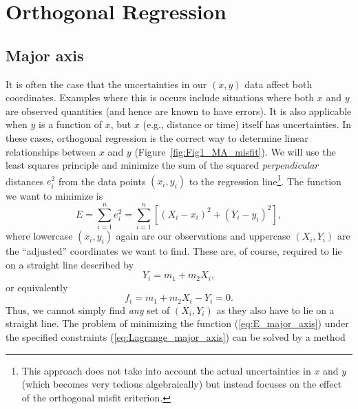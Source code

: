 \section{Orthogonal Regression}
\subsection{Major axis}

	It is often the case that the uncertainties in our $(x,y)$ data affect both coordinates.  
Examples where this is occurs include situations where both $x$ and $y$ are observed quantities 
(and hence are known to have errors).  It is also  applicable when $y$ is a function of $x$, but $x$ (e.g., distance 
or time) itself has uncertainties.  In these cases, orthogonal regression is the correct way to 
determine linear relationships between $x$ and $y$ (Figure~\ref{fig:Fig1_MA_misfit}).
We will use the least squares principle and minimize the sum of the squared \emph{perpendicular} 
distances $e_i^2$ from the data points $(x_i,y_i)$ to the regression line\footnote{This approach does not take into account
the actual uncertainties in $x$ and $y$ (which becomes very tedious algebraically) but instead focuses on the effect
of the orthogonal misfit criterion.}.  The function we want to minimize is
\begin{equation}
E = \sum_{i=1}^n e_i^2 = \sum_{i=1}^n \left [ (X_i - x_i)^2 + (Y_i - y_i)^2 \right ],
\label{eq:E_major_axis}
\end{equation}	 	
where lowercase $(x_i, y_i)$ again are our observations and uppercase $(X_i, Y_i)$ are the ``adjusted'' 
coordinates we want to find.  These are, of course, required to  lie on a straight line described by
\begin{equation}
Y_i = m_1 + m_2 X_i,
\label{eq:line_constraint}
\end{equation}	
or equivalently
\begin{equation}
f_i = m_1 + m_2 X_i - Y_i = 0.
\label{eq:Lagrange_major_axis}
\end{equation}
Thus, we cannot simply find \emph{any} set of $(X_i, Y_i)$ as they also have to lie on a straight line.  The problem 
of minimizing the function (\ref{eq:E_major_axis}) under the specified constraints (\ref{eq:Lagrange_major_axis}) can be solved by a method 
